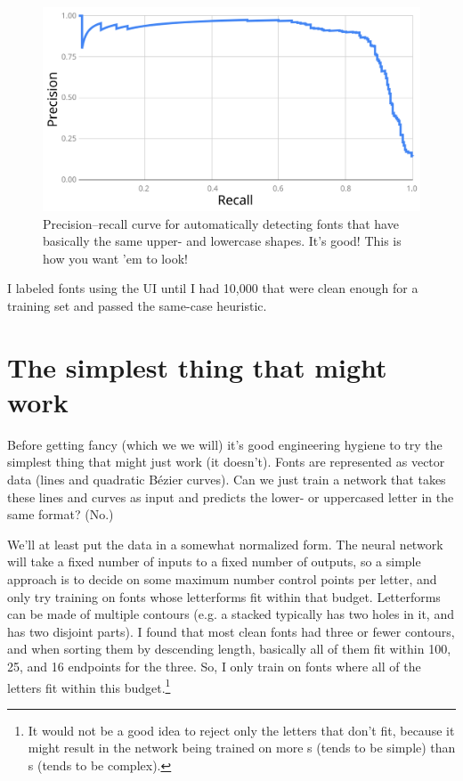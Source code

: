 \documentclass[twocolumn]{article} %
\begin{document}
\begin{figure}[ht]
\centering
  \includegraphics[width=0.9 \linewidth]{samecasepr}
\caption{ Precision--recall curve for automatically detecting fonts
  that have basically the same upper- and lowercase shapes. It's good!
  This is how you want 'em to look!
} \label{fig:samecasepr}
\end{figure}

\medskip

I labeled fonts using the UI until I had 10,000 that were clean enough
for a training set and passed the same-case heuristic.

\section{The simplest thing that might work} \label{sec:vectorversion}

Before getting fancy (which we we will) it's good engineering hygiene
to try the simplest thing that might just work (it doesn't). Fonts
are represented as vector data (lines and quadratic B\'ezier curves).
Can we just train a network that takes these lines and curves as input
and predicts the lower- or uppercased letter in the same format? (No.)

We'll at least put the data in a somewhat normalized form. The neural
network will take a fixed number of inputs to a fixed number of
outputs, so a simple approach is to decide on some maximum number
control points per letter, and only try training on fonts whose
letterforms fit within that budget. Letterforms can be made of
multiple contours (e.g. a stacked  typically has two
holes in it, and  has two disjoint parts). I found that
most clean fonts had three or fewer contours, and when sorting them by
descending length, basically all of them fit within 100, 25, and 16
endpoints for the three. So, I only train on fonts where all of the
letters fit within this budget.\footnote{It would not be a good idea
  to reject only the letters that don't fit, because it might result
  in the network being trained on more s (tends to be
  simple) than s (tends to be complex).}
\end{document}
